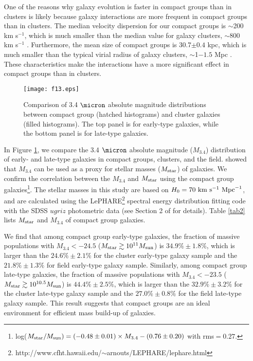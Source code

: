 \documentclass[12pt,preprint,apj]{emulateapj}
\newcommand{\kms}{{\rm km~s^{-1}}}
\begin{document}
One of the reasons why galaxy evolution is faster in compact groups than in clusters 
is likely because galaxy interactions are more frequent in compact groups 
than in clusters. 
The median velocity dispersion for our compact groups is  
$\sim$200 km s$^{-1}$, which is much smaller than the median value
for galaxy clusters, $\sim$800 km s$^{-1}$ \citep{rines+13}.
Furthermore, the mean size of compact groups is 30.7$\pm0.4$ kpc, which  
is much smaller than the typical virial radius of galaxy clusters, $\sim$1$-1.5$ Mpc
\citep{park+09,rines+13}. 
These characteristics make the interactions have a more significant effect 
in compact groups than in clusters.

\begin{figure}
\centering
\texttt{[image: f13.eps]}
\caption{Comparison of 3.4 $\micron$ absolute magnitude distributions 
between compact group (hatched histograms) and cluster galaxies (filled histograms).
The top panel is for early-type galaxies, while the bottom panel is 
for late-type galaxies.
}
\label{w1abs_env}
\end{figure}

In Figure \ref{w1abs_env}, we compare the 3.4 $\micron$ absolute 
magnitude ($M_{3.4}$) distribution of early- and late-type galaxies 
in compact groups, clusters, and the field. 
\citet{hwang+12b} showed that $M_{3.4}$ can be used as 
a proxy for stellar masses ($M_{\rm star}$) of galaxies.
We confirm the correlation between the $M_{3.4}$ and $M_{\rm star}$ 
using the compact group galaxies\footnote{log($M_{\rm star}/M_{\rm sun})=(-0.48\pm0.01)\times M_{3.4}-(0.76\pm0.20)$ with rms$=0.27$. }.
The stellar masses in this study are based on $H_0=70~\kms~{\rm Mpc}^{-1}$, 
and are calculated using the LePHARE\footnote{http://www.cfht.hawaii.edu/$\sim$arnouts/LEPHARE/lephare.html} spectral energy distribution fitting code 
\citep{arnouts+99,ilbert+06} with the SDSS $ugriz$ photometric data 
(see Section 2 of \citealt{sohn+16} for details). 
Table \ref{tab2} lists $M_{\rm star}$ and $M_{3.4}$ of compact group galaxies.

We find that among compact group early-type galaxies, the fraction of 
massive populations with $M_{3.4}<-24.5$ 
($M_{\rm star}\gtrsim10^{11} M_{\rm sun}$) is $34.9\%\pm1.8\%$, 
which is larger than the $24.6\%\pm2.1\%$ for the cluster early-type galaxy sample
and the $21.8\%\pm1.3\%$ for field early-type galaxy sample.
Similarly, among compact group late-type galaxies, the fraction of 
massive populations with $M_{3.4}<-23.5$ 
($M_{\rm star}\gtrsim10^{10.5} M_{\rm sun}$) is $44.4\%\pm2.5\%$, 
which is larger than the $32.9\%\pm3.2\%$ for the cluster late-type galaxy sample 
and the $27.0\%\pm0.8\%$ for the field late-type galaxy sample.
This result suggests that compact groups are an ideal environment for efficient
mass build-up of galaxies.
\end{document}

